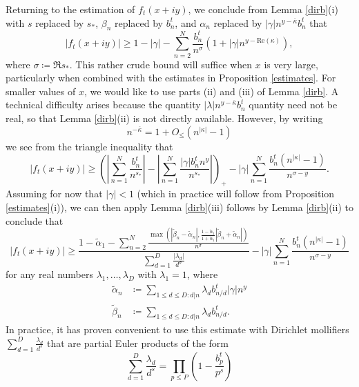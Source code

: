 Returning to the estimation of $f_t(x+iy)$, we conclude from Lemma \ref{dirb}(i) with $s$ replaced by $s_*$, $\beta_n$ replaced by $b_n^t$, and $\alpha_n$ replaced by $|\gamma| n^{y-\overline{\kappa}} b_n^t$ that
\begin{equation}\label{x-init}
|f_t(x+iy)| \geq 1 - |\gamma| - \sum_{n=2}^N \frac{b_n^t}{n^\sigma} (1 + |\gamma| n^{y - \mathrm{Re}(\kappa)}),
\end{equation}
where $\sigma \coloneqq \Re s_*$.  This rather crude bound will suffice when $x$ is very large, particularly when combined with the estimates in Proposition \ref{estimates}.   For smaller values of $x$, we would like to use parts (ii) and (iii) of Lemma \ref{dirb}.  A technical difficulty arises because the quantity $|\lambda| n^{y-\overline{\kappa}} b_n^t$ quantity need not be real, so that Lemma \ref{dirb}(ii) is not directly available.  However, by writing
$$ n^{-\overline{\kappa}} = 1 + O_{\leq}( n^{|\kappa|} - 1 )$$
we see from the triangle inequality that
$$ |f_t(x+iy)| \geq \left( \left| \sum_{n=1}^N \frac{b_n^t}{n^{s_*}}\right| - \left| \sum_{n=1}^N \frac{|\gamma| b_n^t n^y}{n^{s_*}}\right| \right)_+
- |\gamma| \sum_{n=1}^N \frac{b_n^t (n^{|\kappa|} - 1)}{n^{\sigma-y}}.$$
Assuming for now that $|\gamma| < 1$ (which in practice will follow from Proposition \ref{estimates}(i)), we can then apply Lemma \ref{dirb}(iii) follows by Lemma \ref{dirb}(ii) to conclude that
\begin{equation}\label{x-adv}
|f_t(x+iy)| \geq \frac{1 - \tilde \alpha_1 - \sum_{n=2}^N \frac{\max( |\tilde \beta_n-\tilde \alpha_n|, \frac{1-\tilde \alpha_1}{1+\tilde \alpha_1} |\tilde \beta_n+\tilde \alpha_n|)}{n^\sigma}}{\sum_{d=1}^D \frac{|\lambda_d|}{d^\sigma}} - |\gamma| \sum_{n=1}^N \frac{b_n^t (n^{|\kappa|} - 1)}{n^{\sigma-y}}
\end{equation}
for any real numbers $\lambda_1,\dots,\lambda_D$ with $\lambda_1 = 1$, where
\begin{align*}
\tilde \alpha_n &\coloneqq \sum_{1 \leq d \leq D: d|n} \lambda_d b_{n/d}^t |\gamma| n^y \\
\tilde \beta_n &\coloneqq \sum_{1 \leq d \leq D: d|n} \lambda_d b_{n/d}^t.
\end{align*}
In practice, it has proven convenient to use this estimate with Dirichlet mollifiers $\sum_{d=1}^D \frac{\lambda_d}{d^s}$ that are partial Euler products of the form
\begin{equation}\label{ld}
 \sum_{d=1}^D \frac{\lambda_d}{d^s} = \prod_{p \leq P} \left( 1 - \frac{b_p^t}{p^s} \right)
\end{equation}
